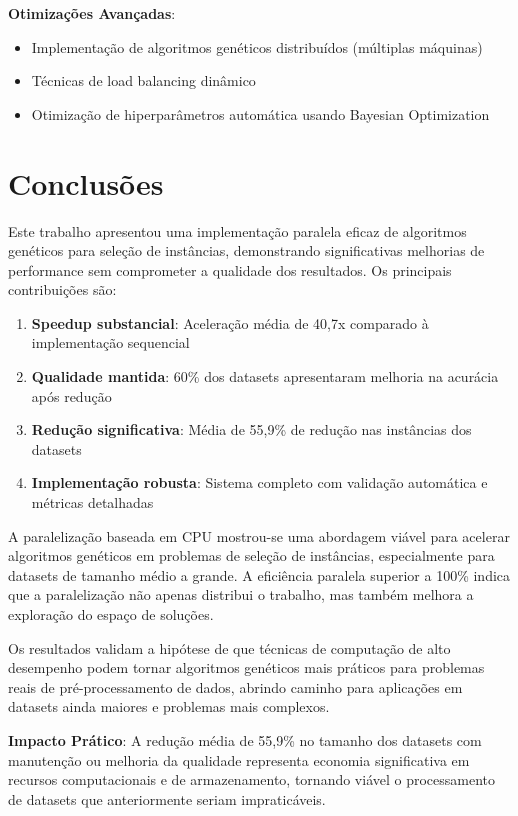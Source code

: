 \documentclass[12pt,a4paper]{article}
\begin{document}
\textbf{Otimizações Avançadas}:
\begin{itemize}
    \item Implementação de algoritmos genéticos distribuídos (múltiplas máquinas)
    \item Técnicas de load balancing dinâmico
    \item Otimização de hiperparâmetros automática usando Bayesian Optimization
\end{itemize}

\section{Conclusões}

Este trabalho apresentou uma implementação paralela eficaz de algoritmos genéticos para seleção de instâncias, demonstrando significativas melhorias de performance sem comprometer a qualidade dos resultados. Os principais contribuições são:

\begin{enumerate}
    \item \textbf{Speedup substancial}: Aceleração média de 40,7x comparado à implementação sequencial
    \item \textbf{Qualidade mantida}: 60\% dos datasets apresentaram melhoria na acurácia após redução
    \item \textbf{Redução significativa}: Média de 55,9\% de redução nas instâncias dos datasets
    \item \textbf{Implementação robusta}: Sistema completo com validação automática e métricas detalhadas
\end{enumerate}

A paralelização baseada em CPU mostrou-se uma abordagem viável para acelerar algoritmos genéticos em problemas de seleção de instâncias, especialmente para datasets de tamanho médio a grande. A eficiência paralela superior a 100\% indica que a paralelização não apenas distribui o trabalho, mas também melhora a exploração do espaço de soluções.

Os resultados validam a hipótese de que técnicas de computação de alto desempenho podem tornar algoritmos genéticos mais práticos para problemas reais de pré-processamento de dados, abrindo caminho para aplicações em datasets ainda maiores e problemas mais complexos.

\textbf{Impacto Prático}: A redução média de 55,9\% no tamanho dos datasets com manutenção ou melhoria da qualidade representa economia significativa em recursos computacionais e de armazenamento, tornando viável o processamento de datasets que anteriormente seriam impraticáveis.
\end{document}
